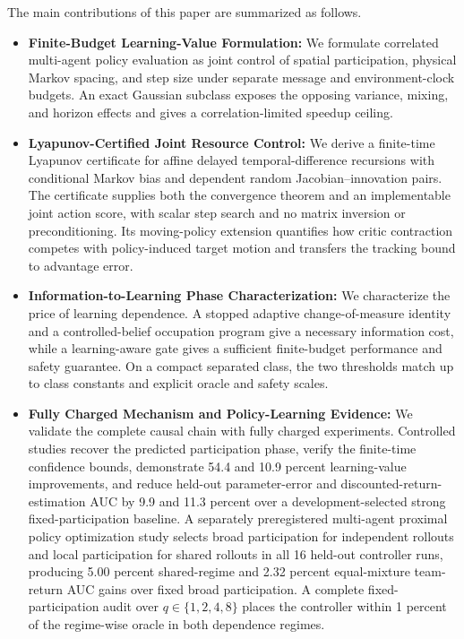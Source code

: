 \documentclass[journal]{IEEEtran}
\begin{document}
The main contributions of this paper are summarized as follows.
\begin{itemize}
\item \textbf{Finite-Budget Learning-Value Formulation:} We formulate correlated multi-agent policy evaluation as joint control of spatial participation, physical Markov spacing, and step size under separate message and environment-clock budgets.
An exact Gaussian subclass exposes the opposing variance, mixing, and horizon effects and gives a correlation-limited speedup ceiling.
\item \textbf{Lyapunov-Certified Joint Resource Control:} We derive a finite-time Lyapunov certificate for affine delayed temporal-difference recursions with conditional Markov bias and dependent random Jacobian--innovation pairs.
The certificate supplies both the convergence theorem and an implementable joint action score, with scalar step search and no matrix inversion or preconditioning.
Its moving-policy extension quantifies how critic contraction competes with policy-induced target motion and transfers the tracking bound to advantage error.
\item \textbf{Information-to-Learning Phase Characterization:} We characterize the price of learning dependence.
A stopped adaptive change-of-measure identity and a controlled-belief occupation program give a necessary information cost, while a learning-aware gate gives a sufficient finite-budget performance and safety guarantee.
On a compact separated class, the two thresholds match up to class constants and explicit oracle and safety scales.
\item \textbf{Fully Charged Mechanism and Policy-Learning Evidence:} We validate the complete causal chain with fully charged experiments.
Controlled studies recover the predicted participation phase, verify the finite-time confidence bounds, demonstrate 54.4 and 10.9 percent learning-value improvements, and reduce held-out parameter-error and discounted-return-estimation AUC by 9.9 and 11.3 percent over a development-selected strong fixed-participation baseline.
A separately preregistered multi-agent proximal policy optimization study selects broad participation for independent rollouts and local participation for shared rollouts in all 16 held-out controller runs, producing 5.00 percent shared-regime and 2.32 percent equal-mixture team-return AUC gains over fixed broad participation.
A complete fixed-participation audit over $q\in\{1,2,4,8\}$ places the controller within 1 percent of the regime-wise oracle in both dependence regimes.
\end{itemize}
\end{document}
